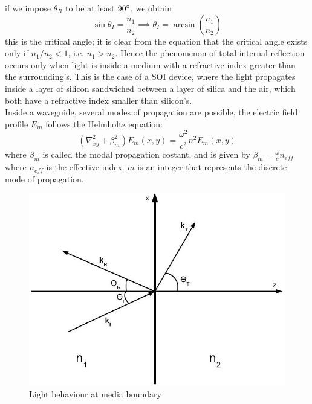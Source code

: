 if we impose $\theta_R$ to be at least $90\degree$, we obtain
\begin{equation}\sin \theta_I = \frac{n_1}{n_2} \implies \theta_I = \arcsin\left(\frac{n_1}{n_2}\right) \end{equation}
this is the critical angle; it is clear from the equation that the critical angle exists only if $n_1/n_2<1$, i.e. $n_1>n_2$. Hence the phenomenon of total internal reflection occurs only when light is inside a medium with a refractive index greater than the surrounding's. This is the case of a SOI device, where the light propagates inside a layer of silicon sandwiched between a layer of silica and the air, which both have a refractive index smaller than silicon's.\\
Inside a waveguide, several modes of propagation are possible, the electric field profile $E_m$ follows the Helmholtz equation:
\begin{equation}(\nabla_{xy}^2 + \beta_m^2)E_m(x,y)= \frac{\omega^2}{c^2}n^2E_m(x,y)\end{equation}
where $\beta_m$ is called the modal propagation costant, and is given by $\beta_m = \frac{\omega}{c}n_{eff}$ where $n_{eff}$ is the effective index. $m$ is an integer that represents the discrete mode of propagation.
\begin{figure}
\centering
\includegraphics[width = .5\textwidth]{img/TIRDiagram3}
\caption{Light behaviour at media boundary}
\label{criticalangle}
\end{figure}

